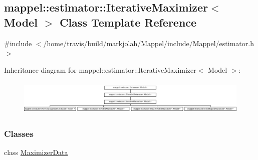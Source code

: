 \hypertarget{classmappel_1_1estimator_1_1IterativeMaximizer}{}\subsection{mappel\+:\+:estimator\+:\+:Iterative\+Maximizer$<$ Model $>$ Class Template Reference}
\label{classmappel_1_1estimator_1_1IterativeMaximizer}


{\ttfamily \#include $<$/home/travis/build/markjolah/\+Mappel/include/\+Mappel/estimator.\+h$>$}

Inheritance diagram for mappel\+:\+:estimator\+:\+:Iterative\+Maximizer$<$ Model $>$\+:\begin{figure}[H]
\begin{center}
\leavevmode
\includegraphics[height=1.696970cm]{classmappel_1_1estimator_1_1IterativeMaximizer}
\end{center}
\end{figure}
\subsubsection*{Classes}
\begin{DoxyCompactItemize}
\item 
class \hyperlink{classmappel_1_1estimator_1_1IterativeMaximizer_1_1MaximizerData}{Maximizer\+Data}
\end{DoxyCompactItemize}

